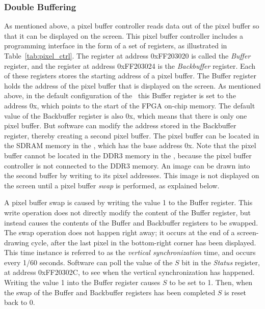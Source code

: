 \subsubsection{Double Buffering}
\label{sec:double_buffer}

As mentioned above, a pixel buffer controller reads data out of the pixel buffer so that it 
can be displayed on the screen. This pixel buffer controller 
includes a programming interface in the form of a set of registers, as
illustrated in Table~\ref{tab:pixel_ctrl}. The register at address {\sf 0xFF203020} is called 
the {\it Buffer} register, and the register at address  {\sf 0xFF203024} is the 
{\it Backbuffer} register. Each of these registers stores the starting address of a pixel 
buffer.  The Buffer register holds the address of the pixel buffer that is displayed on
the screen. As mentioned above, in the default configuration of the \systemName~this 
Buffer register is set to the address {\sf 0x}, which points to the start of the FPGA 
on-chip memory.  The default value of the Backbuffer register is also {\sf 0x},
which means that there is only one pixel buffer. But software can modify the address
stored in the Backbuffer register, thereby creating a second pixel buffer. The pixel
buffer can be located in the SDRAM memory in the \systemName, which has 
the base address {\sf 0x}. Note that the pixel buffer cannot be located in the DDR3 
memory in the \systemName, because the pixel buffer controller is not connected to 
the DDR3 memory.  An image can be drawn into the second buffer by writing to its pixel addresses.
This image is not displayed on the screen until a pixel buffer {\it swap} is performed, 
as explained below.

A pixel buffer swap is caused by writing the value 1 to the Buffer register. This write
operation does not directly modify the content of the Buffer register, but instead causes
the contents of the Buffer and Backbuffer registers to be swapped. The swap operation does
not happen right away; it occurs at the end of a screen-drawing cycle, after the last 
pixel in the bottom-right corner has been displayed. This time instance is referred to as
the {\it vertical synchronization} time, and occurs every 1/60 seconds. Software can poll the
value of the $S$ bit in the {\it Status} register, at address {\sf 0xFF20302C}, to see when 
the vertical synchronization has happened. Writing the value 1 into the Buffer register
causes $S$ to be set to 1. Then, when the swap of the Buffer and Backbuffer registers 
has been completed $S$ is reset back to 0.  

